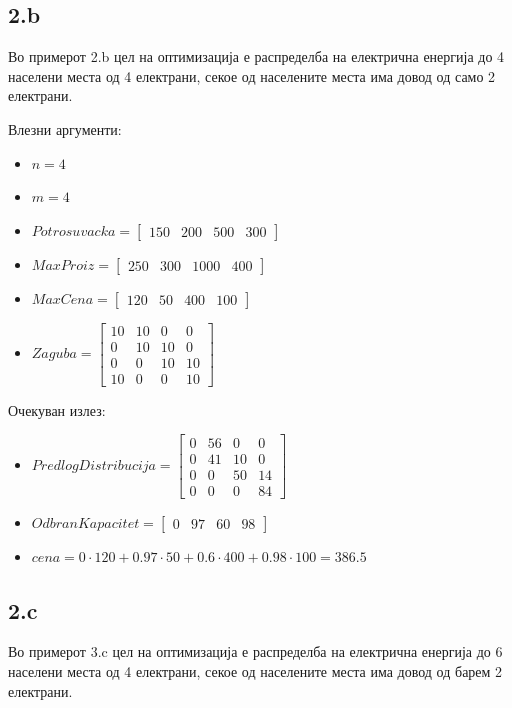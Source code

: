 \documentclass{article}
\begin{document}
\subsection{2.b}
Во примерот 2.b цел на оптимизација е распределба на електрична енергија до 4 населени места од 4 електрани, секое од населените места има довод од само 2 електрани. 

Влезни аргументи:
\begin{itemize}
\item $n = 4$
\item $m = 4$
\item $Potrosuvacka = \begin{bmatrix} 150 & 200 & 500 & 300 \end{bmatrix}$
\item $MaxProiz = \begin{bmatrix} 250 & 300 & 1000 & 400\end{bmatrix}$
\item $MaxCena = \begin{bmatrix} 120 & 50 & 400 & 100 \end{bmatrix}$
\item $Zaguba = \begin{bmatrix} 10 & 10 & 0 & 0 \\ 0 & 10 & 10 & 0 \\ 0 & 0 & 10 & 10 \\ 10 & 0 & 0 & 10 \end{bmatrix}$
\end{itemize}
Очекуван излез:
\begin{itemize}
\item $PredlogDistribucija = \begin{bmatrix} 0 & 56 & 0 & 0 \\ 0 & 41 & 10 & 0 \\ 0 & 0 & 50 & 14 \\ 0 & 0 & 0 & 84 \end{bmatrix}$
\item $OdbranKapacitet = \begin{bmatrix} 0 & 97 & 60 & 98 \end{bmatrix}$
\item $cena = 0 \cdot 120 + 0.97 \cdot 50 + 0.6 \cdot 400 + 0.98 \cdot 100  = 386.5$
\end{itemize}


\subsection{2.c}
Во примерот 3.c цел на оптимизација е распределба на електрична енергија до 6 населени места од 4 електрани, секое од населените места има довод од барем 2 електрани. 
\end{document}
